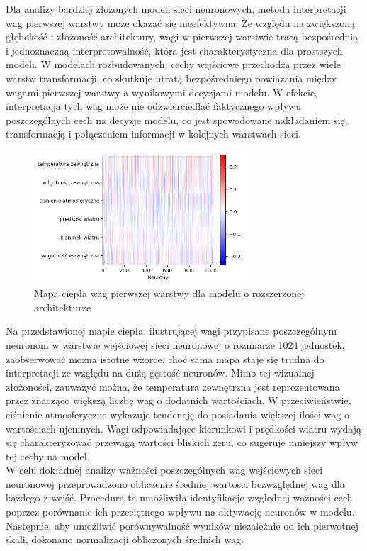 \documentclass[a4paper,twoside,12pt]{book}
\begin{document}
Dla analizy bardziej złożonych modeli sieci neuronowych, metoda interpretacji wag pierwszej warstwy może okazać się nieefektywna. Ze względu na zwiększoną głębokość i złożoność architektury, wagi w pierwszej warstwie tracą bezpośrednią i jednoznaczną interpretowalność, która jest charakterystyczna dla prostszych modeli. W modelach rozbudowanych, cechy wejściowe przechodzą przez wiele warstw transformacji, co skutkuje utratą bezpośredniego powiązania między wagami pierwszej warstwy a wynikowymi decyzjami modelu. W efekcie, interpretacja tych wag może nie odzwierciedlać faktycznego wpływu poszczególnych cech na decyzje modelu, co jest spowodowane nakładaniem się, transformacją i połączeniem informacji w kolejnych warstwach sieci.

\begin{figure}[!h]
  \centering
  \includegraphics[width=0.7\textwidth]{img/heatmap2.png}
  \caption{Mapa ciepła wag pierwszej warstwy dla modelu o rozszerzonej architekturze}
  \label{fig:etykieta-rysunku}
\end{figure}


Na przedstawionej mapie ciepła, ilustrującej wagi przypisane poszczególnym neuronom w warstwie wejściowej sieci neuronowej o rozmiarze 1024 jednostek, zaobserwować można istotne wzorce, choć sama mapa staje się trudna do interpretacji ze względu na dużą gęstość neuronów. Mimo tej wizualnej złożoności, zauważyć można, że temperatura zewnętrzna jest reprezentowana przez znacząco większą liczbę wag o dodatnich wartościach. W przeciwieństwie, ciśnienie atmosferyczne wykazuje tendencję do posiadania większej ilości wag o wartościach ujemnych. Wagi odpowiadające kierunkowi i prędkości wiatru wydają się charakteryzować przewagą wartości bliskich zeru, co sugeruje mniejszy wpływ tej cechy na model.\\

W celu dokładnej analizy ważności poszczególnych wag wejściowych sieci neuronowej przeprowadzono obliczenie średniej wartosci bezwzględnej wag dla każdego z wejść. Procedura ta umożliwiła identyfikację względnej ważności cech poprzez porównanie ich przeciętnego wpływu na aktywację neuronów w modelu. Następnie, aby umożliwić porównywalność wyników niezależnie od ich pierwotnej skali, dokonano normalizacji obliczonych średnich wag.
\newpage
\end{document}
